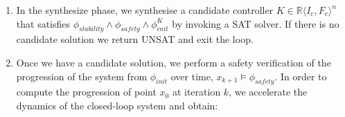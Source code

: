 \documentclass[runningheads,a4paper]{llncs}
\newcommand{\mat}[1]{\boldsymbol{#1}}
\begin{document}
\begin{enumerate}
\begin{enumerate}
\end{enumerate}
\item In the {\sc synthesize} phase, we synthesise a candidate controller
  $K \in \mathbb{R}\langle I_c,F_c\rangle^n$ that satisfies
  $\phi_{stability} \wedge \phi_{safety} \wedge \phi_{init}^{K}$ by invoking a SAT solver.
If there is no candidate solution we return UNSAT and exit the loop.
\item Once we have a candidate solution, we perform a safety verification %
  of the 
  progression of the system from $\phi_{init}$ over time,
$x_{k+1} \models \phi_{safety}$. %
  In order to compute the progression of point $x_0$ at iteration $k$,
  we accelerate the dynamics of the closed-loop system and obtain:

\end{enumerate}
\end{document}
